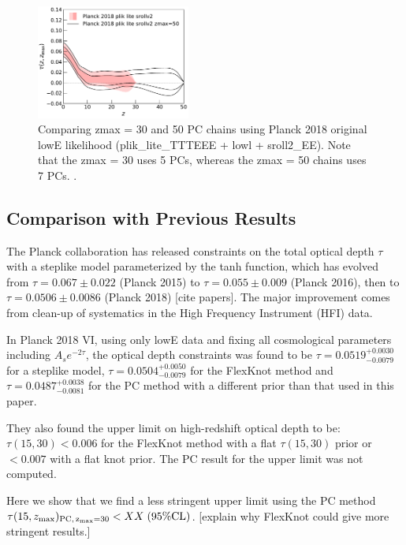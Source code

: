 \documentclass[prd,twocolumn,amsmath,amssymb,floatfix,superscriptaddress,nofootinbib]{revtex4-1}
\newcommand{\zmax}{z_{\rm max}}
\begin{document}
\begin{figure}[ht]
\includegraphics[width=0.45\textwidth]{results/direct_mcmc/pl18_plots_zmax30/plot_pub_tau_gtz_dz_0p1_pl18_pc_zmax30_pliklite_srollv2_0930_and_pl18_pc_zmax50_pliklite_srollv2.pdf}
\caption{Comparing zmax = 30 and 50 PC chains using Planck 2018 original lowE likelihood (plik\_lite\_TTTEEE + lowl + sroll2\_EE). Note that the zmax = 30 uses 5 PCs, whereas the zmax = 50 chains uses 7 PCs. .
}
\label{fig:plot_taugtz_zmax30_vs_zmax50}
\end{figure}


\subsection{Comparison with Previous Results}

The Planck collaboration has released constraints on the total optical depth $\tau$ with a steplike model parameterized by the tanh function, which has evolved from $\tau = 0.067 \pm 0.022$ (Planck 2015) to $\tau = 0.055 \pm 0.009$ (Planck 2016), then to $\tau = 0.0506 \pm 0.0086$ (Planck 2018) [cite papers]. The major improvement comes from clean-up of systematics in the High Frequency Instrument (HFI) data. 

In Planck 2018 VI, using only lowE data and fixing all cosmological parameters including $A_s e^{-2\tau}$, the optical depth constraints was found to be $\tau = 0.0519^{+0.0030}_{-0.0079}$ for a steplike model, $\tau = 0.0504^{+0.0050}
_{-0.0079}$ for the FlexKnot method and $\tau = 0.0487^{+0.0038}_{−0.0081}$ for the PC method with a different prior than that used in this paper. 

They also found the upper limit on high-redshift optical depth to be: $\tau(15, 30) < 0.006$ for the FlexKnot method with a flat $\tau(15, 30)$ prior or $<0.007$ with a flat knot prior. The PC result for the upper limit was not computed. 

Here we show that we find a less stringent upper limit using the PC method $\tau(15, \zmax)_{\rm PC,\, \zmax=30} < XX \; (95\% \mathrm{CL})$. [explain why FlexKnot could give more stringent results.]
\end{document}
